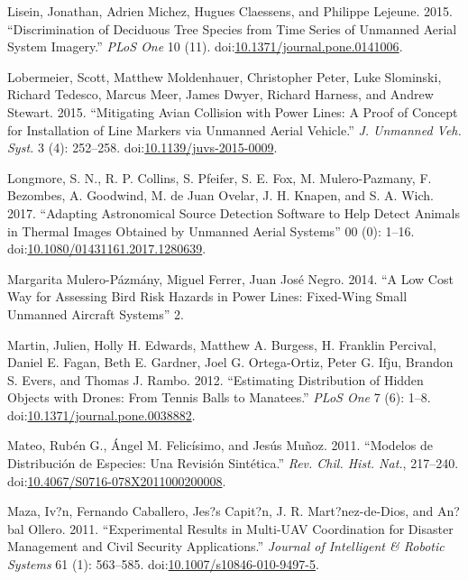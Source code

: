 \documentclass[]{interact}
\theoremstyle{plain}%
\theoremstyle{definition}
\theoremstyle{remark}
\begin{document}
\hypertarget{ref-lisein_discrimination_2015}{}
Lisein, Jonathan, Adrien Michez, Hugues Claessens, and Philippe Lejeune.
2015. ``Discrimination of Deciduous Tree Species from Time Series of
Unmanned Aerial System Imagery.'' \emph{PLoS One} 10 (11).
doi:\href{https://doi.org/10.1371/journal.pone.0141006}{10.1371/journal.pone.0141006}.

\hypertarget{ref-lobermeier_mitigating_2015}{}
Lobermeier, Scott, Matthew Moldenhauer, Christopher Peter, Luke
Slominski, Richard Tedesco, Marcus Meer, James Dwyer, Richard Harness,
and Andrew Stewart. 2015. ``Mitigating Avian Collision with Power Lines:
A Proof of Concept for Installation of Line Markers via Unmanned Aerial
Vehicle.'' \emph{J. Unmanned Veh. Syst.} 3 (4): 252--258.
doi:\href{https://doi.org/10.1139/juvs-2015-0009}{10.1139/juvs-2015-0009}.

\hypertarget{ref-longmore_adapting_2017}{}
Longmore, S. N., R. P. Collins, S. Pfeifer, S. E. Fox, M.
Mulero-Pazmany, F. Bezombes, A. Goodwind, M. de Juan Ovelar, J. H.
Knapen, and S. A. Wich. 2017. ``Adapting Astronomical Source Detection
Software to Help Detect Animals in Thermal Images Obtained by Unmanned
Aerial Systems'' 00 (0): 1--16.
doi:\href{https://doi.org/10.1080/01431161.2017.1280639}{10.1080/01431161.2017.1280639}.

\hypertarget{ref-margarita_mulero-pazmany_juan_jose_negro_low_2014}{}
Margarita Mulero-Pázmány, Miguel Ferrer, Juan José Negro. 2014. ``A Low
Cost Way for Assessing Bird Risk Hazards in Power Lines: Fixed-Wing
Small Unmanned Aircraft Systems'' 2.

\hypertarget{ref-martin_estimating_2012}{}
Martin, Julien, Holly H. Edwards, Matthew A. Burgess, H. Franklin
Percival, Daniel E. Fagan, Beth E. Gardner, Joel G. Ortega-Ortiz, Peter
G. Ifju, Brandon S. Evers, and Thomas J. Rambo. 2012. ``Estimating
Distribution of Hidden Objects with Drones: From Tennis Balls to
Manatees.'' \emph{PLoS One} 7 (6): 1--8.
doi:\href{https://doi.org/10.1371/journal.pone.0038882}{10.1371/journal.pone.0038882}.

\hypertarget{ref-mateo_modelos_2011}{}
Mateo, Rubén G., Ángel M. Felicísimo, and Jesús Muñoz. 2011. ``Modelos
de Distribución de Especies: Una Revisión Sintética.'' \emph{Rev. Chil.
Hist. Nat.}, 217--240.
doi:\href{https://doi.org/10.4067/S0716-078X2011000200008}{10.4067/S0716-078X2011000200008}.

\hypertarget{ref-maza_experimental_2011}{}
Maza, Iv?n, Fernando Caballero, Jes?s Capit?n, J. R. Mart?nez-de-Dios,
and An?bal Ollero. 2011. ``Experimental Results in Multi-UAV
Coordination for Disaster Management and Civil Security Applications.''
\emph{Journal of Intelligent \& Robotic Systems} 61 (1): 563--585.
doi:\href{https://doi.org/10.1007/s10846-010-9497-5}{10.1007/s10846-010-9497-5}.
\end{document}
